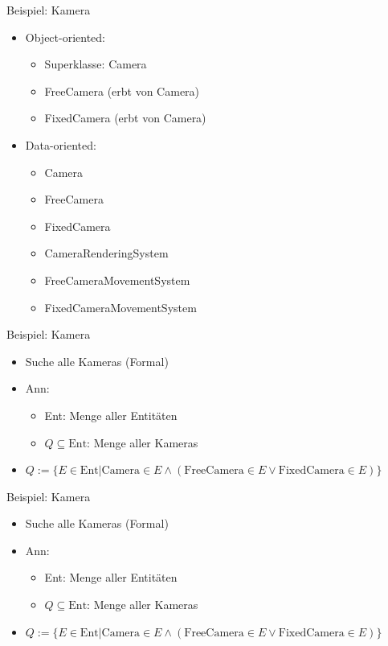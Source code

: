 \documentclass{presentation}
\begin{document}
\begin{frame}{Beispiel: Kamera}
    \begin{itemize}
        \item Object-oriented:
        \begin{itemize}
            \item Superklasse: Camera
            \item FreeCamera (erbt von Camera)
            \item FixedCamera (erbt von Camera)
        \end{itemize}
        \item Data-oriented:
        \begin{itemize}
            \item Camera
            \item FreeCamera
            \item FixedCamera
            \item CameraRenderingSystem
            \item FreeCameraMovementSystem
            \item FixedCameraMovementSystem
        \end{itemize}
    \end{itemize}
\end{frame}

\begin{frame}{Beispiel: Kamera}
    \begin{itemize}
        \item Suche alle Kameras (Formal)
        \item Ann:
        \begin{itemize}
            \item Ent: Menge aller Entitäten
            \item $Q \subseteq \text{Ent}$: Menge aller Kameras
        \end{itemize}
        \item $Q := \{ E \in \text{Ent} | \text{Camera} \in E \wedge (\text{FreeCamera} \in E \vee \text{FixedCamera} \in E)\}$
    \end{itemize}
\end{frame}

\begin{frame}{Beispiel: Kamera}
    \begin{itemize}
        \item Suche alle Kameras (Formal)
        \item Ann:
        \begin{itemize}
            \item Ent: Menge aller Entitäten
            \item $Q \subseteq \text{Ent}$: Menge aller Kameras
        \end{itemize}
        \item $Q := \{ E \in \text{Ent} | \text{Camera} \in E \wedge (\text{FreeCamera} \in E \vee \text{FixedCamera} \in E)\}$
    \end{itemize}
\end{frame}
\end{document}
